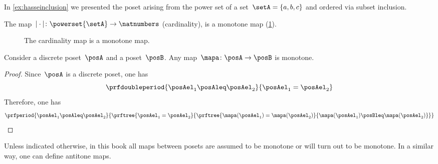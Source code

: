 \begin{example}
    In \cref{ex:hasseinclusion} we presented the poset arising from the power set of a set~$\setA=\{a,b,c\}$ and ordered via subset inclusion.

    The map~$\vert \cdot \vert \colon \powerset{\setA} \to \natnumbers$ (cardinality), is a monotone map (\cref{fig:cardinality}).
    \begin{figure}[h!]
        \centering
        \caption{The cardinality map is a monotone map. }
        \label{fig:cardinality}
    \end{figure}
\end{example}

\begin{lemma}
    Consider a discrete poset~$\posA$ and a poset~$\posB$.
    Any map~$\mapa \colon \posA\to \posB$ is monotone.
\end{lemma}
\newcommand{\samewidth}[1]{\makebox[3cm]{$#1$}}
\begin{proof}
    Since~$\posA$ is a discrete poset, one has
    \begin{equation}
        \prfdoubleperiod{\posAel_1\posAleq \posAel_2}{\posAel_1=\posAel_2}
    \end{equation}
    Therefore, one has
    \begin{equation}
        \prfperiod{
        \posAel_1\posAleq \posAel_2
        }{
        \prftree{
        \posAel_1=\posAel_2
        }{
        \prftree{
        \mapa(\posAel_1)=\mapa(\posAel_2)
        }{
        \mapa(\posAel_1)\posBleq \mapa(\posAel_2)
        }
        }
        }
    \end{equation}
\end{proof}
Unless indicated otherwise, in this book all maps between posets are assumed to be monotone or will turn out to be monotone.
In a similar way, one can define antitone maps.

